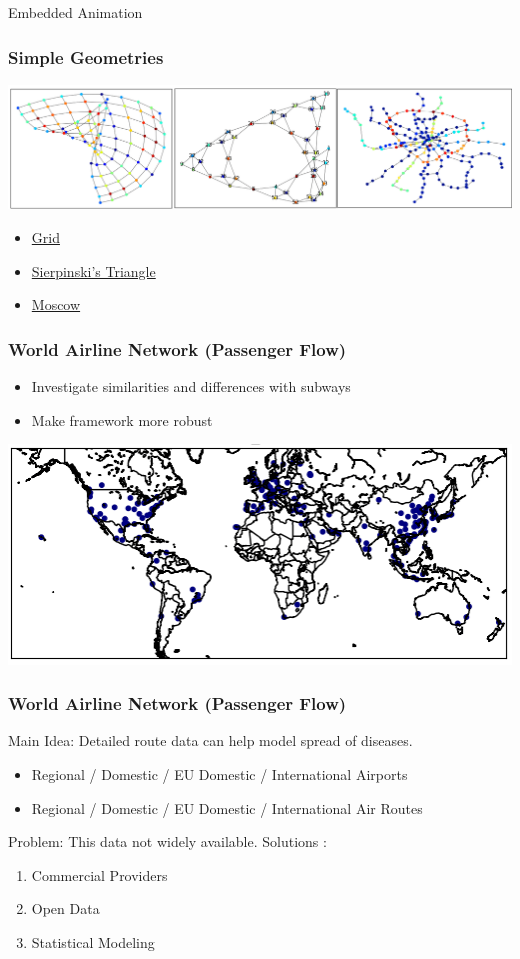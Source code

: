 \documentclass{beamer}
\begin{document}
\begin{frame}{Embedded Animation}
\frametitle{Simple Geometries}
\includegraphics[width=1.0\textwidth]{Scratch_Visuals/geometries_example.png}
\begin{itemize}
    \item \href{https://github.com/cheung-ho-lum/NS_Epidemics_ABM_Approach/blob/master/Repository/Visualizations/infection_timelapse_grid_01.gif}{Grid}
    \item \href{https://github.com/cheung-ho-lum/NS_Epidemics_ABM_Approach/blob/master/Repository/Visualizations/infection_timelapse_sierpinski_01.gif}{Sierpinski's Triangle}
    \item \href{https://github.com/cheung-ho-lum/NS_Epidemics_ABM_Approach/blob/master/Repository/Visualizations/infection_timelapse_moscow.gif}{Moscow}
\end{itemize}
\end{frame}
\begin{frame}
\frametitle{World Airline Network (Passenger Flow)}
\begin{itemize}
    \item Investigate similarities and differences with subways
    \item Make framework more robust
\end{itemize}
\includegraphics[width=1.0\textwidth]{Scratch_Visuals/covid_airlines_initial.png}
\end{frame}
\begin{frame}
\frametitle{World Airline Network (Passenger Flow)}
Main Idea: Detailed route data can help model spread of diseases.
\begin{itemize}
    \item Regional / Domestic / EU Domestic / International Airports
    \item Regional / Domestic / EU Domestic / International Air Routes
\end{itemize}
Problem: This data not widely available. Solutions \cite{mao_wu_huang_tatem_2015}:
\begin{enumerate}
	\item Commercial Providers
	\item Open Data
	\item Statistical Modeling
\end{enumerate}
\end{frame}
\end{document}
